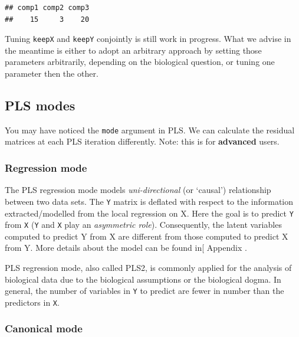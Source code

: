 \documentclass[]{book}
\newenvironment{Shaded}{\begin{snugshade}}{\end{snugshade}}
\newcommand{\NormalTok}[1]{#1}
\newcommand{\OperatorTok}[1]{\textcolor[rgb]{0.81,0.36,0.00}{\textbf{#1}}}
\begin{document}
\begin{Shaded}
\end{Shaded}

\begin{verbatim}
## comp1 comp2 comp3 
##    15     3    20
\end{verbatim}

Tuning \texttt{keepX} and \texttt{keepY} conjointly is still work in progress. What we advise in the meantime is either to adopt an arbitrary approach by setting those parameters arbitrarily, depending on the biological question, or tuning one parameter then the other.

\hypertarget{PLS:details}{%
\subsection{PLS modes}\label{PLS:details}}

You may have noticed the \texttt{mode} argument in PLS. We can calculate the residual matrices at each PLS iteration differently. Note: this is for \textbf{advanced} users.

\hypertarget{regression-mode}{%
\subsubsection{Regression mode}\label{regression-mode}}

The PLS regression mode models \emph{uni-directional} (or `causal') relationship between two data sets. The \texttt{Y} matrix is deflated with respect to the information extracted/modelled from the local regression on X. Here the goal is to predict \texttt{Y} from \texttt{X} (\texttt{Y} and \texttt{X} play an \emph{asymmetric role}). Consequently, the latent variables computed to predict Y from X are different from those computed to predict X from Y. More details about the model can be found in{[} Appendix \citep{Lec08}.

PLS regression mode, also called PLS2, is commonly applied for the analysis of biological data \citep{Bou05, Byl07} due to the biological assumptions or the biological dogma. In general, the number of variables in \texttt{Y} to predict are fewer in number than the predictors in \texttt{X}.

\hypertarget{canonical-mode}{%
\subsubsection{Canonical mode}\label{canonical-mode}}
\end{document}
